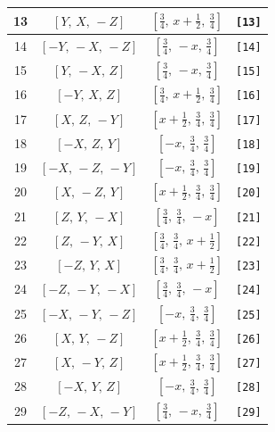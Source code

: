 \documentclass[fleqn,8pt]{jsarticle}
\begin{document}
\begin{longtable}{cccc}
13 & $\left[ Y,\, X,\, - Z \right]$ & $\left[ \frac{3}{4},\, x + \frac{1}{2},\, \frac{3}{4} \right]$ & {\tt [13]} \\ \hline
14 & $\left[ - Y,\, - X,\, - Z \right]$ & $\left[ \frac{3}{4},\, - x,\, \frac{3}{4} \right]$ & {\tt [14]} \\ \hline
15 & $\left[ Y,\, - X,\, Z \right]$ & $\left[ \frac{3}{4},\, - x,\, \frac{3}{4} \right]$ & {\tt [15]} \\ \hline
16 & $\left[ - Y,\, X,\, Z \right]$ & $\left[ \frac{3}{4},\, x + \frac{1}{2},\, \frac{3}{4} \right]$ & {\tt [16]} \\ \hline
17 & $\left[ X,\, Z,\, - Y \right]$ & $\left[ x + \frac{1}{2},\, \frac{3}{4},\, \frac{3}{4} \right]$ & {\tt [17]} \\ \hline
18 & $\left[ - X,\, Z,\, Y \right]$ & $\left[ - x,\, \frac{3}{4},\, \frac{3}{4} \right]$ & {\tt [18]} \\ \hline
19 & $\left[ - X,\, - Z,\, - Y \right]$ & $\left[ - x,\, \frac{3}{4},\, \frac{3}{4} \right]$ & {\tt [19]} \\ \hline
20 & $\left[ X,\, - Z,\, Y \right]$ & $\left[ x + \frac{1}{2},\, \frac{3}{4},\, \frac{3}{4} \right]$ & {\tt [20]} \\ \hline
21 & $\left[ Z,\, Y,\, - X \right]$ & $\left[ \frac{3}{4},\, \frac{3}{4},\, - x \right]$ & {\tt [21]} \\ \hline
22 & $\left[ Z,\, - Y,\, X \right]$ & $\left[ \frac{3}{4},\, \frac{3}{4},\, x + \frac{1}{2} \right]$ & {\tt [22]} \\ \hline
23 & $\left[ - Z,\, Y,\, X \right]$ & $\left[ \frac{3}{4},\, \frac{3}{4},\, x + \frac{1}{2} \right]$ & {\tt [23]} \\ \hline
24 & $\left[ - Z,\, - Y,\, - X \right]$ & $\left[ \frac{3}{4},\, \frac{3}{4},\, - x \right]$ & {\tt [24]} \\ \hline
25 & $\left[ - X,\, - Y,\, - Z \right]$ & $\left[ - x,\, \frac{3}{4},\, \frac{3}{4} \right]$ & {\tt [25]} \\ \hline
26 & $\left[ X,\, Y,\, - Z \right]$ & $\left[ x + \frac{1}{2},\, \frac{3}{4},\, \frac{3}{4} \right]$ & {\tt [26]} \\ \hline
27 & $\left[ X,\, - Y,\, Z \right]$ & $\left[ x + \frac{1}{2},\, \frac{3}{4},\, \frac{3}{4} \right]$ & {\tt [27]} \\ \hline
28 & $\left[ - X,\, Y,\, Z \right]$ & $\left[ - x,\, \frac{3}{4},\, \frac{3}{4} \right]$ & {\tt [28]} \\ \hline
29 & $\left[ - Z,\, - X,\, - Y \right]$ & $\left[ \frac{3}{4},\, - x,\, \frac{3}{4} \right]$ & {\tt [29]} \\ \hline

\end{longtable}
\end{document}
